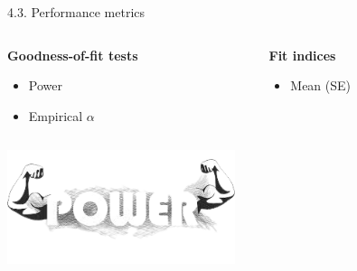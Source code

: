 \documentclass[aspectratio=169]{beamer}
\begin{document}
\begin{frame}[t]{4.3. Performance metrics}

\begin{columns}

\begin{column}{0.5\textwidth}
	\begin{center}
\textbf{Goodness-of-fit tests}
	\end{center}
	
\begin{itemize}
	\item{Power}
	\item{Empirical $\alpha$}
\end{itemize}

\end{column}

\begin{column}{0.5\textwidth}
	\begin{center}
\textbf{Fit indices}
	\end{center}

\begin{itemize}
	\item{Mean (SE)}
\end{itemize}

\end{column}

\end{columns}
\vspace{1cm}
\includegraphics[width = 0.5\textwidth]{images/power.png}

\end{frame}
\end{document}
